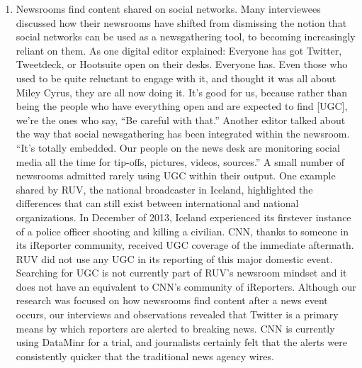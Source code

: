 \documentclass[symmetric, notoc, nobib]{towcenter-book}
\begin{document}
\begin{enumerate}
\item Newsrooms find content shared on social networks.
Many interviewees discussed how their newsrooms have shifted from dismissing
the notion that social networks can be used as a newsgathering tool,
to becoming increasingly reliant on them. As one digital editor explained:
Everyone has got Twitter, Tweetdeck, or Hootsuite open on their
desks. Everyone has. Even those who used to be quite reluctant to
engage with it, and thought it was all about Miley Cyrus, they are all
now doing it. It's good for us, because rather than being the people
who have everything open and are expected to find [UGC], we're the
ones who say, ``Be careful with that.''
Another editor talked about the way that social newsgathering has been
integrated within the newsroom. ``It's totally embedded. Our people on the
news desk are monitoring social media all the time for tip-offs, pictures,
videos, sources.''
A small number of newsrooms admitted rarely using UGC within their
output. One example shared by RUV, the national broadcaster in Iceland,
highlighted the differences that can still exist between international and
national organizations. In December of 2013, Iceland experienced its firstever
instance of a police officer shooting and killing a civilian. CNN, thanks
to someone in its iReporter community, received UGC coverage of the
immediate aftermath. RUV did not use any UGC in its reporting of this
major domestic event. Searching for UGC is not currently part of RUV's
newsroom mindset and it does not have an equivalent to CNN's community
of iReporters.
Although our research was focused on how newsrooms find content after
a news event occurs, our interviews and observations revealed that Twitter
is a primary means by which reporters are alerted to breaking news. CNN
is currently using DataMinr for a trial, and journalists certainly felt that
the alerts were consistently quicker that the traditional news agency wires.


\end{enumerate}
\end{document}
